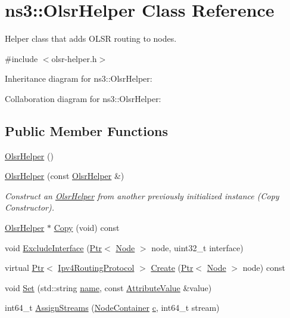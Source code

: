 \hypertarget{classns3_1_1OlsrHelper}{}\section{ns3\+:\+:Olsr\+Helper Class Reference}
\label{classns3_1_1OlsrHelper}


Helper class that adds O\+L\+SR routing to nodes.  




{\ttfamily \#include $<$olsr-\/helper.\+h$>$}



Inheritance diagram for ns3\+:\+:Olsr\+Helper\+:


Collaboration diagram for ns3\+:\+:Olsr\+Helper\+:
\subsection*{Public Member Functions}
\begin{DoxyCompactItemize}
\item 
\hyperlink{classns3_1_1OlsrHelper_a8034ff5ce55ebba4fec74e296ab33fff}{Olsr\+Helper} ()
\item 
\hyperlink{classns3_1_1OlsrHelper_aeb06813f3b2dc26fa856e3f6ecfdef7d}{Olsr\+Helper} (const \hyperlink{classns3_1_1OlsrHelper}{Olsr\+Helper} \&)
\begin{DoxyCompactList}\small\item\em Construct an \hyperlink{classns3_1_1OlsrHelper}{Olsr\+Helper} from another previously initialized instance (Copy Constructor). \end{DoxyCompactList}\item 
\hyperlink{classns3_1_1OlsrHelper}{Olsr\+Helper} $\ast$ \hyperlink{classns3_1_1OlsrHelper_af546fca892f59583bd40a9611dd4ec91}{Copy} (void) const 
\item 
void \hyperlink{classns3_1_1OlsrHelper_a22808d14d002eb691aef05b4d20e997b}{Exclude\+Interface} (\hyperlink{classns3_1_1Ptr}{Ptr}$<$ \hyperlink{classns3_1_1Node}{Node} $>$ node, uint32\+\_\+t interface)
\item 
virtual \hyperlink{classns3_1_1Ptr}{Ptr}$<$ \hyperlink{classns3_1_1Ipv4RoutingProtocol}{Ipv4\+Routing\+Protocol} $>$ \hyperlink{classns3_1_1OlsrHelper_abf3f54af63afa19675712bee4934ad82}{Create} (\hyperlink{classns3_1_1Ptr}{Ptr}$<$ \hyperlink{classns3_1_1Node}{Node} $>$ node) const 
\item 
void \hyperlink{classns3_1_1OlsrHelper_a1b7fe6e589f5577f5ada88d36cba613f}{Set} (std\+::string \hyperlink{generate__test__data__lte__spectrum__model_8m_ab74e6bf80237ddc4109968cedc58c151}{name}, const \hyperlink{classns3_1_1AttributeValue}{Attribute\+Value} \&value)
\item 
int64\+\_\+t \hyperlink{classns3_1_1OlsrHelper_a6898beef4a3c7386621a013a44b2f37f}{Assign\+Streams} (\hyperlink{classns3_1_1NodeContainer}{Node\+Container} \hyperlink{mmwave_2model_2fading-traces_2fading__trace__generator_8m_ae0323a9039add2978bf5b49550572c7c}{c}, int64\+\_\+t stream)
\end{DoxyCompactItemize}
